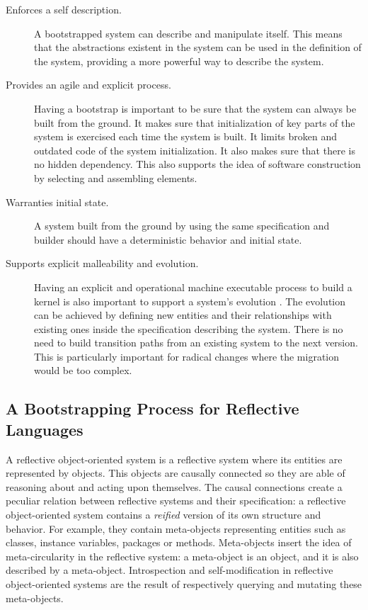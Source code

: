 \begin{description}
\item[Enforces a self description.] A bootstrapped system can describe and manipulate itself. This means that the abstractions existent in the system can be used in the definition of the system, providing a more powerful way to describe the system.

 \item[Provides an agile and explicit process.] Having a bootstrap is important to be sure that the system can always be built from the ground.  
It makes sure that initialization of key parts of the system is exercised each time the system is built. It limits broken and outdated code of the system initialization. It also makes sure that there is no hidden dependency. This also supports the idea of software construction by selecting and assembling elements. 
 
\item[Warranties initial state.] A system built from the ground by using the same specification and builder should have a deterministic behavior and initial state.  

\item[Supports explicit malleability and evolution.] Having an explicit and operational machine executable process to build a kernel is also important to support a system's evolution \cite{Casa09a}. The evolution can be achieved by defining new entities and their relationships with existing ones inside the specification describing the system. There is no need to build transition paths from an existing system to the next version. This is particularly important for radical changes where the migration would be too complex.
 
\end{description}

\subsection{A Bootstrapping Process for Reflective Languages}\label{sec:model}

A reflective object-oriented system is a reflective system where its entities are represented by objects. This objects are causally connected so they are able of reasoning about and acting upon themselves.
The causal connections create a peculiar relation between reflective systems and their specification: a reflective object-oriented system contains a \emph{reified} version of its own structure and behavior.
For example, they contain meta-objects representing entities such as classes, instance variables, packages or methods.
Meta-objects insert the idea of meta-circularity in the reflective system: a meta-object is an object, and it is also described by a meta-object.
Introspection and self-modification in reflective object-oriented systems are the result of respectively querying and mutating these meta-objects.

